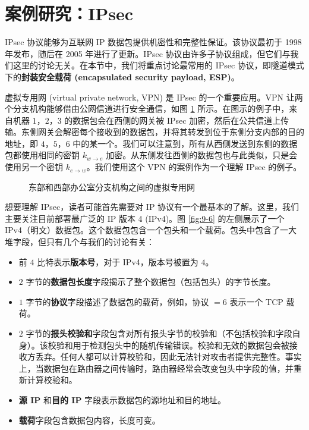 \section{案例研究：IPsec}\label{sec:9-11}

IPsec 协议能够为互联网 IP 数据包提供机密性和完整性保证。该协议最初于 1998 年发布，随后在 2005 年进行了更新。IPsec 协议由许多子协议组成，但它们与我们这里的讨论无关。在本节中，我们将重点讨论最常用的 IPsec 协议，即隧道模式下的\textbf{封装安全载荷 (encapsulated security payload, ESP)}。

虚拟专用网 (virtual private network, VPN) 是 IPsec 的一个重要应用。VPN 让两个分支机构能够借由公网信道进行安全通信，如图 \ref{fig:9-5} 所示。在图示的例子中，来自机器 $1$，$2$，$3$ 的数据包会在西侧的网关被 IPsec 加密，然后在公共信道上传输。东侧网关会解密每个接收到的数据包，并将其转发到位于东侧分支内部的目的地址，即 $4$，$5$，$6$ 中的某一个。我们可以注意到，所有从西侧发送到东侧的数据包都使用相同的密钥 $k_{w\to e}$ 加密。从东侧发往西侧的数据包也与此类似，只是会使用另一个密钥 $k_{e\to w}$。我们使用这个 VPN 的案例作为一个理解 IPsec 的例子。

\begin{figure}
  \centering
  
  \caption{东部和西部办公室分支机构之间的虚拟专用网}
  \label{fig:9-5}
\end{figure}

想要理解 IPsec，读者可能首先需要对 IP 协议有一个最基本的了解。这里，我们主要关注目前部署最广泛的 IP 版本 4 (IPv4)。图 \ref{fig:9-6} 的左侧展示了一个 IPv4（明文）数据包。这个数据包包含一个包头和一个载荷。包头中包含了一大堆字段，但只有几个与我们的讨论有关：
\begin{itemize}
	\item 前 $4$ 比特表示\textbf{版本号}，对于 IPv4，版本号被置为 $4$。
	\item $2$ 字节的\textbf{数据包长度}字段揭示了整个数据包（包括包头）的字节长度。
	\item $1$ 字节的\textbf{协议}字段描述了数据包的载荷，例如，协议 $=6$ 表示一个 TCP 载荷。
	\item $2$ 字节的\textbf{报头校验和}字段包含对所有报头字节的校验和（不包括校验和字段自身）。该校验和用于检测包头中的随机传输错误。校验和无效的数据包会被接收方丢弃。任何人都可以计算校验和，因此无法针对攻击者提供完整性。事实上，当数据包在路由器之间传输时，路由器经常会改变包头中字段的值，并重新计算校验和。
	\item \textbf{源 IP} 和\textbf{目的 IP} 字段表示数据包的源地址和目的地址。
	\item \textbf{载荷}字段包含数据包内容，长度可变。
\end{itemize}

